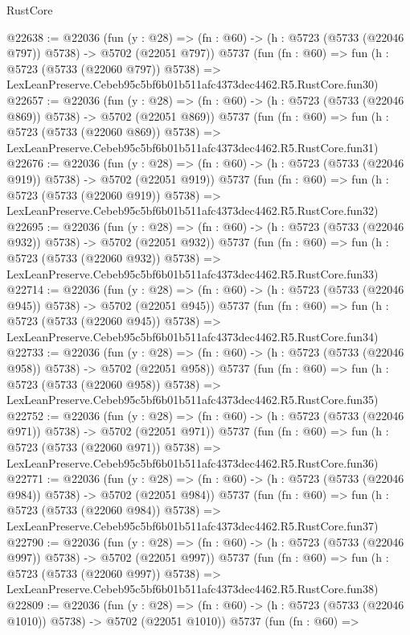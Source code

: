 \begin{lexlean}{RustCore}
\begin{coremodule}
@22638 := @22036
    (fun (y : @28) => (fn : @60) -> (h : @5723 (@5733 (@22046 @797)) @5738) -> @5702 (@22051 @797))
    @5737
    (fun (fn : @60) =>
    fun (h : @5723 (@5733 (@22060 @797)) @5738) =>
    LexLeanPreserve.Cebeb95c5bf6b01b511afc4373dec4462.R5.RustCore.fun30)
@22657 := @22036
    (fun (y : @28) => (fn : @60) -> (h : @5723 (@5733 (@22046 @869)) @5738) -> @5702 (@22051 @869))
    @5737
    (fun (fn : @60) =>
    fun (h : @5723 (@5733 (@22060 @869)) @5738) =>
    LexLeanPreserve.Cebeb95c5bf6b01b511afc4373dec4462.R5.RustCore.fun31)
@22676 := @22036
    (fun (y : @28) => (fn : @60) -> (h : @5723 (@5733 (@22046 @919)) @5738) -> @5702 (@22051 @919))
    @5737
    (fun (fn : @60) =>
    fun (h : @5723 (@5733 (@22060 @919)) @5738) =>
    LexLeanPreserve.Cebeb95c5bf6b01b511afc4373dec4462.R5.RustCore.fun32)
@22695 := @22036
    (fun (y : @28) => (fn : @60) -> (h : @5723 (@5733 (@22046 @932)) @5738) -> @5702 (@22051 @932))
    @5737
    (fun (fn : @60) =>
    fun (h : @5723 (@5733 (@22060 @932)) @5738) =>
    LexLeanPreserve.Cebeb95c5bf6b01b511afc4373dec4462.R5.RustCore.fun33)
@22714 := @22036
    (fun (y : @28) => (fn : @60) -> (h : @5723 (@5733 (@22046 @945)) @5738) -> @5702 (@22051 @945))
    @5737
    (fun (fn : @60) =>
    fun (h : @5723 (@5733 (@22060 @945)) @5738) =>
    LexLeanPreserve.Cebeb95c5bf6b01b511afc4373dec4462.R5.RustCore.fun34)
@22733 := @22036
    (fun (y : @28) => (fn : @60) -> (h : @5723 (@5733 (@22046 @958)) @5738) -> @5702 (@22051 @958))
    @5737
    (fun (fn : @60) =>
    fun (h : @5723 (@5733 (@22060 @958)) @5738) =>
    LexLeanPreserve.Cebeb95c5bf6b01b511afc4373dec4462.R5.RustCore.fun35)
@22752 := @22036
    (fun (y : @28) => (fn : @60) -> (h : @5723 (@5733 (@22046 @971)) @5738) -> @5702 (@22051 @971))
    @5737
    (fun (fn : @60) =>
    fun (h : @5723 (@5733 (@22060 @971)) @5738) =>
    LexLeanPreserve.Cebeb95c5bf6b01b511afc4373dec4462.R5.RustCore.fun36)
@22771 := @22036
    (fun (y : @28) => (fn : @60) -> (h : @5723 (@5733 (@22046 @984)) @5738) -> @5702 (@22051 @984))
    @5737
    (fun (fn : @60) =>
    fun (h : @5723 (@5733 (@22060 @984)) @5738) =>
    LexLeanPreserve.Cebeb95c5bf6b01b511afc4373dec4462.R5.RustCore.fun37)
@22790 := @22036
    (fun (y : @28) => (fn : @60) -> (h : @5723 (@5733 (@22046 @997)) @5738) -> @5702 (@22051 @997))
    @5737
    (fun (fn : @60) =>
    fun (h : @5723 (@5733 (@22060 @997)) @5738) =>
    LexLeanPreserve.Cebeb95c5bf6b01b511afc4373dec4462.R5.RustCore.fun38)
@22809 := @22036
    (fun (y : @28) =>
    (fn : @60) -> (h : @5723 (@5733 (@22046 @1010)) @5738) -> @5702 (@22051 @1010))
    @5737
    (fun (fn : @60) =>

\end{coremodule}
\end{lexlean}
